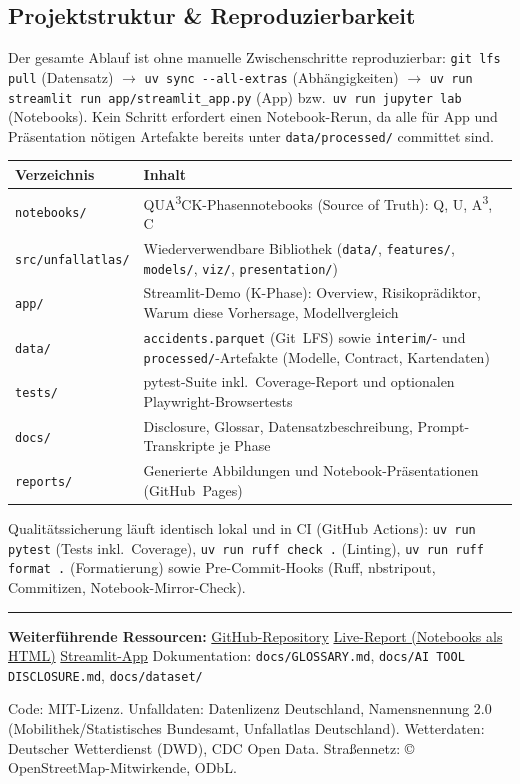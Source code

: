 \documentclass[11pt,a4paper]{article}
\newcommand{\code}[1]{\texttt{\small #1}}
\begin{document}
\subsection*{Projektstruktur \& Reproduzierbarkeit}
Der gesamte Ablauf ist ohne manuelle Zwischenschritte reproduzierbar:
\code{git lfs pull} (Datensatz) $\rightarrow$ \code{uv sync -{}-all-extras}
(Abhängigkeiten) $\rightarrow$ \code{uv run streamlit run
app/streamlit\_app.py} (App) bzw.\ \code{uv run jupyter lab}
(Notebooks). Kein Schritt erfordert einen Notebook-Rerun, da alle für
App und Präsentation nötigen Artefakte bereits unter
\code{data/processed/} committet sind.

\begin{center}
\small
\begin{tabularx}{\linewidth}{lY}
\toprule
\textbf{Verzeichnis} & \textbf{Inhalt} \\
\midrule
\code{notebooks/} & QUA\textsuperscript{3}CK-Phasennotebooks (Source of Truth): Q, U, A\textsuperscript{3}, C \\
\code{src/unfallatlas/} & Wiederverwendbare Bibliothek (\code{data/}, \code{features/}, \code{models/}, \code{viz/}, \code{presentation/}) \\
\code{app/} & Streamlit-Demo (K-Phase): Overview, Risikoprädiktor, Warum diese Vorhersage, Modellvergleich \\
\code{data/} & \code{accidents.parquet} (Git~LFS) sowie \code{interim/}- und \code{processed/}-Artefakte (Modelle, Contract, Kartendaten) \\
\code{tests/} & pytest-Suite inkl.\ Coverage-Report und optionalen Playwright-Browsertests \\
\code{docs/} & Disclosure, Glossar, Datensatzbeschreibung, Prompt-Transkripte je Phase \\
\code{reports/} & Generierte Abbildungen und Notebook-Präsentationen (GitHub~Pages) \\
\bottomrule
\end{tabularx}
\end{center}

Qualitätssicherung läuft identisch lokal und in CI (GitHub Actions):
\code{uv run pytest} (Tests inkl.\ Coverage), \code{uv run ruff check .}
(Linting), \code{uv run ruff format .} (Formatierung) sowie
Pre-Commit-Hooks (Ruff, nbstripout, Commitizen, Notebook-Mirror-Check).

\vspace{2pt}
\noindent\rule{\linewidth}{0.4pt}\par\vspace{2pt}
{\small\textbf{Weiterführende Ressourcen:}
\href{https://github.com/jonasyr/unfallatlas-qua3ck}{GitHub-Repository} \textbar{}
\href{https://jonasyr.github.io/unfallatlas-qua3ck/}{Live-Report (Notebooks als HTML)} \textbar{}
\href{https://unfallatlas-qua3ck-fg5thv4lthkbhw86er3kfk.streamlit.app}{Streamlit-App} \textbar{}
Dokumentation: \code{docs/GLOSSARY.md}, \code{docs/AI TOOL DISCLOSURE.md}, \code{docs/dataset/}\par}

{\scriptsize Code: MIT-Lizenz. Unfalldaten: Datenlizenz Deutschland,
Namensnennung 2.0 (Mobilithek/Statistisches Bundesamt, Unfallatlas
Deutschland). Wetterdaten: Deutscher Wetterdienst (DWD), CDC Open Data.
Straßennetz: \copyright{} OpenStreetMap-Mitwirkende, ODbL.}
\end{document}
